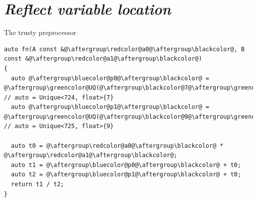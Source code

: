 \documentclass[xcolor=dvipsnames]{beamer}
\begin{document}


\section{\protect\textit{Reflect variable location}}


\begin{frame}[fragile]{The trusty preprocessor}
\begin{lstlisting}
auto fn(A const &@\aftergroup\redcolor@a0@\aftergroup\blackcolor@, B const &@\aftergroup\redcolor@a1@\aftergroup\blackcolor@)
{
  auto @\aftergroup\bluecolor@p0@\aftergroup\blackcolor@ = @\aftergroup\greencolor@UQ(@\aftergroup\blackcolor@7@\aftergroup\greencolor@)@\aftergroup\blackcolor@; // auto = Unique<724, float>{7}
  auto @\aftergroup\bluecolor@p1@\aftergroup\blackcolor@ = @\aftergroup\greencolor@UQ(@\aftergroup\blackcolor@9@\aftergroup\greencolor@)@\aftergroup\blackcolor@; // auto = Unique<725, float>{9}

  auto t0 = @\aftergroup\redcolor@a0@\aftergroup\blackcolor@ * @\aftergroup\redcolor@a1@\aftergroup\blackcolor@;
  auto t1 = @\aftergroup\bluecolor@p0@\aftergroup\blackcolor@ + t0;
  auto t2 = @\aftergroup\bluecolor@p1@\aftergroup\blackcolor@ + t0;
  return t1 / t2;
}
\end{lstlisting}
\end{frame}
\end{document}
